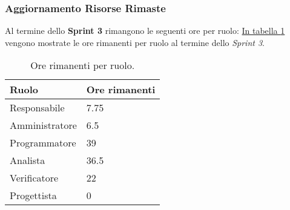 \subsubsection{Aggiornamento Risorse Rimaste}
\label{sec:AggiornamentoRisorse_Sprint3}
Al termine dello \textbf{Sprint 3} rimangono le seguenti ore per ruolo: \hyperref[tab:sprint3_ore_rimanenti]{In tabella \ref{tab:sprint3_ore_rimanenti}} vengono mostrate le ore rimanenti per ruolo al termine dello \textit{Sprint 3}.

\begin{table}[H]
    \centering
    \begin{tabular}{| l | l |}
    \hline
    \textbf{Ruolo} & 
    \textbf{Ore rimanenti}\\
    \hline
        Responsabile & 7.75\\
    \hline
        Amministratore & 6.5\\
    \hline
        Programmatore & 39\\
    \hline
        Analista & 36.5\\
    \hline
        Verificatore & 22\\
    \hline
        Progettista & 0\\
    \hline
    \end{tabular}
    \caption{Ore rimanenti per ruolo.}
    \label{tab:sprint3_ore_rimanenti} 
\end{table}